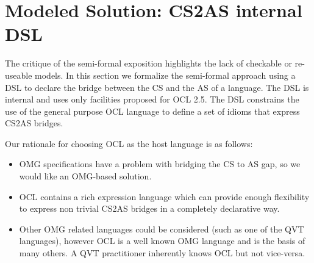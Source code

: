 \documentclass{llncs}
\begin{document}



\section{Modeled Solution: CS2AS internal DSL}
\label{sec:solution}

The critique of the semi-formal exposition highlights the lack of checkable or re-useable models. In this section we formalize the semi-formal approach using a DSL to declare the bridge between the CS and the AS of a language. The DSL is  internal \cite{fowler2010dsl} and uses only facilities proposed for OCL 2.5. The DSL constrains the use of the general purpose OCL language to define  a set of idioms that express CS2AS bridges.

Our rationale for choosing OCL as the host language is as follows:
\begin{itemize}
\item OMG specifications have a problem with bridging the CS to AS gap, so we would like an OMG-based solution.
\item OCL contains a rich expression language which can provide enough flexibility to express non trivial CS2AS bridges in a completely declarative way.
\item Other OMG related languages could be considered (such as one of the QVT languages), however OCL is a well known OMG language and is the basis of many others. A QVT practitioner inherently knows OCL but not vice-versa.
\end{itemize}
\end{document}
